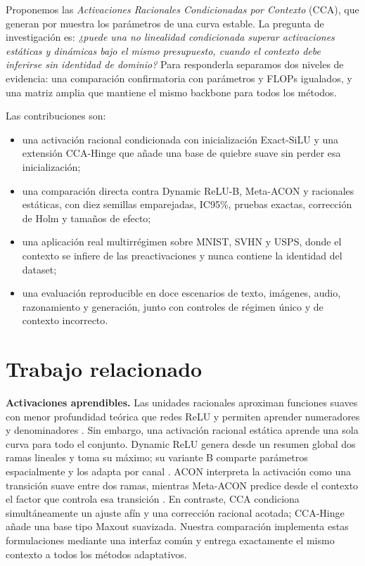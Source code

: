 \documentclass[runningheads]{llncs}
\begin{document}
Proponemos las \textit{Activaciones Racionales Condicionadas por Contexto} (CCA), que generan por muestra los parámetros de una curva estable. La pregunta de investigación es: \emph{¿puede una no linealidad condicionada superar activaciones estáticas y dinámicas bajo el mismo presupuesto, cuando el contexto debe inferirse sin identidad de dominio?} Para responderla separamos dos niveles de evidencia: una comparación confirmatoria con parámetros y FLOPs igualados, y una matriz amplia que mantiene el mismo backbone para todos los métodos.

Las contribuciones son:
\begin{itemize}
\item una activación racional condicionada con inicialización Exact-SiLU y una extensión CCA-Hinge que añade una base de quiebre suave sin perder esa inicialización;
\item una comparación directa contra Dynamic ReLU-B, Meta-ACON y racionales estáticas, con diez semillas emparejadas, IC95\%, pruebas exactas, corrección de Holm y tamaños de efecto;
\item una aplicación real multirrégimen sobre MNIST, SVHN y USPS, donde el contexto se infiere de las preactivaciones y nunca contiene la identidad del dataset;
\item una evaluación reproducible en doce escenarios de texto, imágenes, audio, razonamiento y generación, junto con controles de régimen único y de contexto incorrecto.
\end{itemize}

\section{Trabajo relacionado}
\textbf{Activaciones aprendibles.} Las unidades racionales aproximan funciones suaves con menor profundidad teórica que redes ReLU y permiten aprender numeradores y denominadores \cite{boulle2020rational}. Sin embargo, una activación racional estática aprende una sola curva para todo el conjunto. Dynamic ReLU genera desde un resumen global dos ramas lineales y toma su máximo; su variante B comparte parámetros espacialmente y los adapta por canal \cite{chen2020dynamic}. ACON interpreta la activación como una transición suave entre dos ramas, mientras Meta-ACON predice desde el contexto el factor que controla esa transición \cite{ma2021activate}. En contraste, CCA condiciona simultáneamente un ajuste afín y una corrección racional acotada; CCA-Hinge añade una base tipo Maxout suavizada. Nuestra comparación implementa estas formulaciones mediante una interfaz común y entrega exactamente el mismo contexto a todos los métodos adaptativos.
\end{document}

